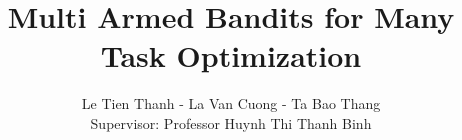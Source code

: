 \title{Multi Armed Bandits for Many Task Optimization}
\author{Le Tien Thanh - La Van Cuong - Ta Bao Thang \\ Supervisor: Professor Huynh Thi Thanh Binh}